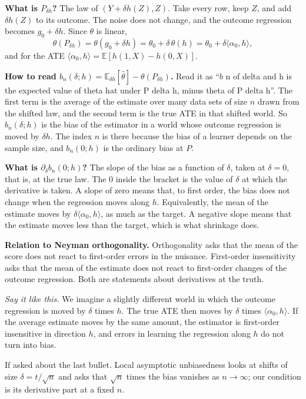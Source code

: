 \documentclass[10pt]{article}
\newcommand{\E}{\mathbb{E}}
\newcommand{\say}[1]{\par\textit{Say it like this.} #1\par}
\begin{document}
\textbf{What is $P_{\delta h}$?} The law of $(Y+\delta h(Z),Z)$. Take every row, keep $Z$, and add $\delta h(Z)$ to its
outcome. The noise does not change, and the outcome regression becomes $g_0+\delta h$. Since $\theta$ is linear,
\[
\theta(P_{\delta h})=\theta(g_0+\delta h)=\theta_0+\delta\,\theta(h)=\theta_0+\delta\langle\alpha_0,h\rangle,
\]
and for the ATE $\langle\alpha_0,h\rangle=\E[h(1,X)-h(0,X)]$.

\textbf{How to read $b_n(\delta;h)=\E_{\delta h}[\hat\theta]-\theta(P_{\delta h})$.} Read it as ``$b$ n of delta and
h is the expected value of theta hat under P delta h, minus theta of P delta h''. The first term is the average of the
estimate over many data sets of size $n$ drawn from the shifted law, and the second term is the true ATE in that
shifted world. So $b_n(\delta;h)$ is the bias of the estimator in a world whose outcome regression is moved by
$\delta h$. The index $n$ is there because the bias of a learner depends on the sample size, and $b_n(0;h)$ is the
ordinary bias at $P$.

\textbf{What is $\partial_\delta b_n(0;h)$?} The slope of the bias as a function of $\delta$, taken at $\delta=0$, that
is, at the true law. The $0$ inside the bracket is the value of $\delta$ at which the derivative is taken. A slope of
zero means that, to first order, the bias does not change when the regression moves along $h$. Equivalently, the mean
of the estimate moves by $\delta\langle\alpha_0,h\rangle$, as much as the target. A negative slope means that the
estimate moves less than the target, which is what shrinkage does.

\textbf{Relation to Neyman orthogonality.} Orthogonality asks that the mean of the score does not react to first-order
errors in the nuisance. First-order insensitivity asks that the mean of the estimate does not react to first-order
changes of the outcome regression. Both are statements about derivatives at the truth.
\say{We imagine a slightly different world in which the outcome regression is moved by $\delta$ times $h$. The true
ATE then moves by $\delta$ times $\langle\alpha_0,h\rangle$. If the average estimate moves by the same amount, the
estimator is first-order insensitive in direction $h$, and errors in learning the regression along $h$ do not turn into
bias.}

If asked about the last bullet. Local asymptotic unbiasedness looks at shifts of size $\delta=t/\sqrt n$ and asks that
$\sqrt n$ times the bias vanishes as $n\to\infty$; our condition is its derivative part at a fixed $n$.
\end{document}
